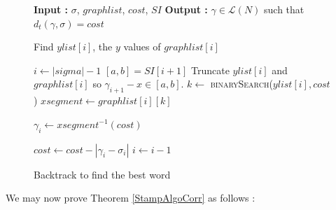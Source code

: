 \documentclass[conference]{IEEEtran}
\makeatletter
\newcommand{\removelatexerror}{\let\@latex@error\@gobble}
\makeatother
\begin{document}
	\begin{figure}[!t]
		\removelatexerror
		\begin{algorithm}[H]
			\caption{Backtrack to find the best word}
			\label{AuxFunc3}
			\begin{algorithmic}
				\State \textbf{Input : }  $\sigma$, $graphlist$, $cost$, $SI$
				\State \textbf{Output : }  $\gamma \in \mathcal{L}(N)$ such that $d_t(\gamma, \sigma) = cost$
				
				\State Find $ylist[i]$, the $y$ values of $graphlist[i]$
				\EndFor
				
				\State $i \gets |sigma|-1$
				\State $[a, b] = SI[i+1]$ 
				\State Truncate $ylist[i]$ and $graphlist[i]$ so $ \gamma_{i+1} - x \in [a, b]$. 
				\State $k \gets $ \textsc{binarySearch}($ylist[i], cost$)
				\State $xsegment \gets graphlist[i][k]$
				
				\State $\gamma_i \gets xsegment^{-1}(cost)$
				
				\State $cost \gets cost - |\gamma_i - \sigma_i|$
				\State $i \gets i-1$
				\EndWhile
				
			\end{algorithmic}
		\end{algorithm}
	\end{figure}
	
	We may now prove Theorem \ref{StampAlgoCorr} as follows : 
	
\end{document}
